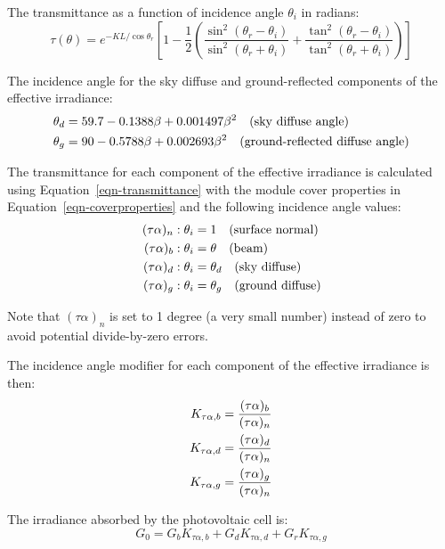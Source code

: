 \documentclass[12pt,letterpaper]{article}
\begin{document}
The transmittance as a function of incidence angle $\theta_i$ in radians:
\begin{equation}\label{eqn-transmittance}
\tau(\theta) = e^{-K L/\cos \theta_r} \left[1 - \frac{1}{2} \left( \frac{\sin^2(\theta_r-\theta_i)}{\sin^2(\theta_r+\theta_i)}
			+ \frac{\tan^2(\theta_r-\theta_i)}{\tan^2(\theta_r+\theta_i)} \right)\right] 
\end{equation}

The incidence angle for the sky diffuse and ground-reflected components of the effective irradiance:
\begin{align}
\theta_d &= 59.7 - 0.1388 \beta + 0.001497 \beta^2 \quad\text{(sky diffuse angle)} \notag\\
\theta_g &= 90 - 0.5788 \beta  + 0.002693 \beta^2 \quad\text{(ground-reflected diffuse angle)} 
\end{align}

The transmittance for each component of the effective irradiance is calculated using Equation~\ref{eqn-transmittance} with the module cover properties in Equation~\ref{eqn-coverproperties} and the following incidence angle values:
\begin{align}
(\tau\alpha)_n: \theta_i &= 1 \quad\text{(surface normal)} \notag\\
(\tau\alpha)_b: \theta_i &= \theta \quad\text{(beam)} \notag\\
(\tau\alpha)_d: \theta_i &= \theta_d \quad\text{(sky diffuse)} \notag\\
(\tau\alpha)_g: \theta_i &= \theta_g  \quad\text{(ground diffuse)}
\end{align}

Note that $(\tau\alpha)_n$ is set to 1 degree (a very small number) instead of zero to avoid potential divide-by-zero errors.

The incidence angle modifier for each component of the effective irradiance is then:
\begin{align}
K_{\tau\alpha,b} = \frac{(\tau\alpha)_b}{(\tau\alpha)_n} \notag\\
K_{\tau\alpha,d} = \frac{(\tau\alpha)_d}{(\tau\alpha)_n} \notag\\
K_{\tau\alpha,g} = \frac{(\tau\alpha)_g}{(\tau\alpha)_n}
\end{align}

The irradiance absorbed by the photovoltaic cell is:
\begin{equation}
G_0 = G_b K_{\tau\alpha,b} + G_d K_{\tau\alpha,d} + G_r K_{\tau\alpha,g}
\end{equation}
\end{document}
